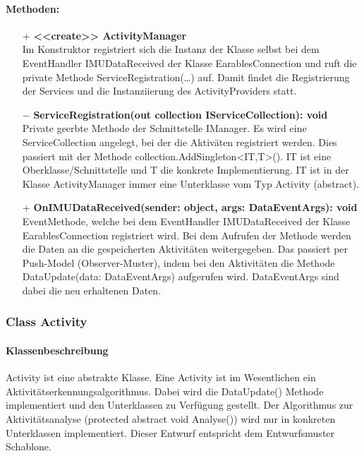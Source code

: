 \documentclass[a4paper,12pt]{article}
\begin{document}
	\paragraph{Methoden:}
	\begin{itemize}
		\item[+] \textbf{<<create>> ActivityManager}\\Im Konstruktor registriert sich die Instanz der Klasse selbst bei dem EventHandler IMUDataReceived der Klasse EarablesConnection und ruft die private Methode ServiceRegistration(\dots) auf. Damit findet die Registrierung der Services und die Instanziierung des ActivityProviders statt.
		\item[$-$] \textbf{ServiceRegistration(out collection IServiceCollection): void}\\Private geerbte Methode der Schnittstelle IManager. Es wird eine ServiceCollection angelegt, bei der die Aktiväten registriert werden. Dies passiert mit der Methode collection.AddSingleton<IT,T>(). IT ist eine Oberklasse/Schnittstelle und T die konkrete Implementierung. IT ist in der Klasse ActivityManager immer eine Unterklasse vom Typ Activity (abstract).
		\item[+] \textbf{OnIMUDataReceived(sender: object, args: DataEventArgs): void}\\EventMethode, welche bei dem EventHandler IMUDataReceived der Klasse EarablesConnection registriert wird. Bei dem Aufrufen der Methode werden die Daten an die gespeicherten Aktivitäten weitergegeben. Das passiert per Push-Model (Observer-Muster), indem bei den Aktivitäten die Methode DataUpdate(data: DataEventArgs) aufgerufen wird. DataEventArgs sind dabei die neu erhaltenen Daten.
	\end{itemize}
	
	
	\subsubsection{Class Activity}
	\paragraph{Klassenbeschreibung}
	Activity ist eine abstrakte Klasse. Eine Activity ist im Wesentlichen ein Aktivitätserkennungsalgorithmus. Dabei wird die DataUpdate() Methode implementiert und den Unterklassen zu Verfügung gestellt. Der Algorithmus zur Aktivitätsanalyse (protected abstract void Analyse()) wird nur in konkreten Unterklassen implementiert. Dieser Entwurf entspricht dem Entwurfsmuster Schablone.
	
\end{document}
